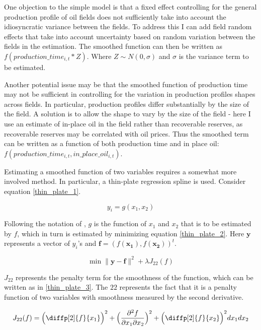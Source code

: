 \documentclass[11pt]{article}
\begin{document}
One objection to the simple model is that a fixed effect controlling for the general production profile of oil fields does not sufficiently take into account the idiosyncratic variance between the fields. To address this I can add field random effects that take into account uncertainty based on random variation between the fields in the estimation. The smoothed function can then be written as $f(production\_time_{i,t}*Z)$.  Where $Z \sim N(0, \sigma)$ and $\sigma$ is the variance term to be estimated.  

Another potential issue may be that the smoothed function of production time may not be sufficient in controlling for the variation in production profiles shapes across fields.  In particular, production profiles differ substantially by the size of the field. A solution is to allow the shape to vary by the size of the field - here I use an estimate of in-place oil in the field rather than recoverable reserves, as recoverable reserves may be correlated with oil prices.  Thus the smoothed term can be written as a function of both production time and in place oil: $f(production\_time_{i,t}, in\_place\_oil_{i,t})$.

Estimating a smoothed function of two variables requires a somewhat more involved method.  In particular, a thin-plate regression spline \citep{wood_thin_2003} is used. Consider equation \ref{thin_plate_1}. 

	\begin{equation}
	y_i = g(x_1, x_2)
	\label{thin_plate_1}
	\end{equation}

Following the notation of \citet{wood_generalized_2006}, $g$ is the function of $x_1$ and $x_2$ that is to be estimated by $f$, which in turn is estimated by minimizing equation \ref{thin_plate_2}.  Here $\boldsymbol{y}$ represents a vector of $y_i$'s and $\boldsymbol{f} = (f(\boldsymbol{x_1}),f(\boldsymbol{x_2}))^t$.   

	\begin{equation}
\min \|\boldsymbol{y-f}\|^2 + \lambda J_{22}(f)
\label{thin_plate_2}
	\end{equation}

$J_{22}$ represents the penalty term for the smoothness of the function, which can be written as in \ref{thin_plate_3}.  The $22$ represents the fact that it is a penalty function of two variables with smoothness measured by the second derivative.

	\begin{equation}
	J_{22}(f)= \Big(  \diffp[2]{f}{x_1} \Big)^2 +
	 \Big(\frac{\partial^2 f}{\partial x_1 \partial x_2}\Big)^2 + 
	\Big(\diffp[2]{f}{x_2} \Big)^2dx_1 dx_2
\label{thin_plate_3}
	\end{equation}
\end{document}
